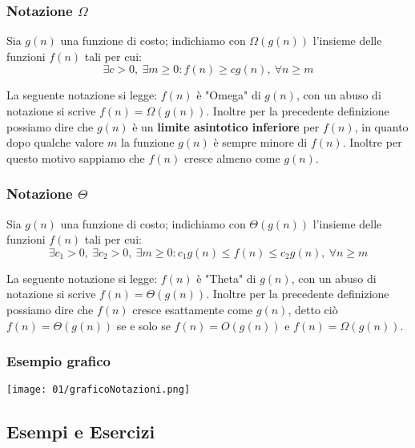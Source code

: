         \subsubsection{Notazione $ \Omega $}
            \begin{definition}
                Sia $ g(n) $ una funzione di costo; indichiamo con $ \Omega(g(n)) $ l'insieme delle funzioni $ f(n) $ tali per cui: 
                $$ \exists c>0,\ \exists m\geq 0: f(n) \geq cg(n),\ \forall n\geq m $$
            \end{definition}
            La seguente notazione si legge: $ f(n) $ è "Omega" di $ g(n) $, con un abuso di notazione si scrive $ f(n)=\Omega(g(n)) $. Inoltre per la precedente definizione possiamo dire che $ g(n) $ è un \textbf{limite asintotico inferiore} per $ f(n) $, in quanto dopo qualche valore $ m $ la funzione $ g(n) $ è sempre minore di $ f(n) $. Inoltre per questo motivo sappiamo che $ f(n) $ cresce almeno come $ g(n) $.
        \subsubsection{Notazione $ \Theta $}
            \begin{definition}
                Sia $ g(n) $ una funzione di costo; indichiamo con $ \Theta(g(n)) $ l'insieme delle funzioni $ f(n) $ tali per cui: 
                $$ \exists c_1>0,\ \exists c_2>0,\ \exists m\geq 0: c_1g(n) \leq f(n) \leq c_2g(n),\ \forall n\geq m $$
            \end{definition}
            La seguente notazione si legge: $ f(n) $ è "Theta" di $ g(n) $, con un abuso di notazione si scrive $ f(n)=\Theta(g(n)) $. Inoltre per la precedente definizione possiamo dire che $ f(n) $ cresce esattamente come $ g(n) $, detto ciò $ f(n)= \Theta(g(n)) $ se e solo se $ f(n)=O(g(n)) $ e $ f(n)=\Omega(g(n)) $.
        \subsubsection*{Esempio grafico}
            \texttt{[image: 01/graficoNotazioni.png]}
    \subsection{Esempi e Esercizi}
